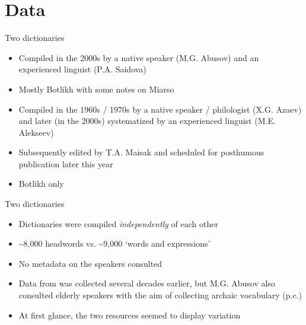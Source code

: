 \section{Data}
\begin{frame}{Two dictionaries}

\begin{block}{\citep{saidovaabusov2012}}
    \begin{itemize}
        \item Compiled in the 2000s by a native speaker (M.G. Abusov) and an experienced linguist (P.A. Saidova)
        \item Mostly Botlikh with some notes on Miarso
    \end{itemize}
\end{block}

\pause

\begin{block}{\citep{alekseev2019}}
    \begin{itemize}
        \item Compiled in the 1960s / 1970s by a native speaker / philologist (X.G. Azaev) and later (in the 2000s) systematized by an experienced linguist (M.E. Alekseev)
        \item Subsequently edited by T.A. Maisak and scheduled for posthumous publication later this year
        \item Botlikh only %
    \end{itemize}
\end{block}
\end{frame}

\begin{frame}{Two dictionaries}

\begin{itemize}
    \item Dictionaries were compiled \textit{independently} of each other
    \item \textasciitilde{}8,000 headwords \citep{saidovaabusov2012} vs. \textasciitilde{}9,000 `words and expressions' \citep{alekseev2019} %
    \item No metadata on the speakers consulted
    \item Data from \citep{alekseev2019} was collected several decades earlier, but M.G. Abusov also consulted elderly speakers with the aim of collecting archaic vocabulary (p.c.)
    \pause
    \item At first glance, the two resources seemed to display variation
\end{itemize}

\end{frame}

